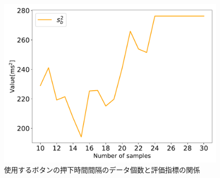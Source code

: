 \begin{figure}[bt]
  \centering
  \includegraphics[scale=0.6]{figures/Yobi/Var/NumberOfSamples_varSb.pdf}
  \caption{使用するボタンの押下時間間隔のデータ個数と評価指標の関係}
  \label{fig:Numberofsamples_Sb}
\end{figure}

